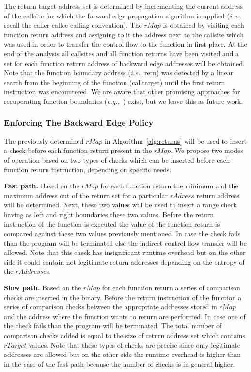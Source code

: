 The return target address set is determined by incrementing the current address of
the callsite for which the forward edge propagation algorithm is applied 
(\textit{i.e.,} recall the caller callee calling convention).
The $rMap$ is obtained by visiting each function return address and assigning to it the address next to the callsite
which was used in order to transfer the control flow to the function in first place. 
At the end of the analysis all callsites and all function returns have been visited and a set for each function return address of backward edge 
addresses will be obtained.
Note that the function boundary address (\textit{i.e.,} retn) was detected by a linear search from the beginning of 
the function (calltarget) until the first return instruction was encountered. We are aware that other promising approaches for recuperating 
function boundaries (\textit{e.g.,}~\cite{function:boundary}) exist, but we leave this as future work.

\subsubsection{Enforcing The Backward Edge Policy}
The previously determined $rMap$ in Algorithm~\ref{alg:returns} will be used to insert a check before each 
function return present in the $rMap$. We propose two modes of operation based on two types
of checks which can be inserted before each function return instruction, depending on specific needs.

\textbf{Fast path.} Based on the $rMap$ for each function return the minimum and the maximum address out of the return set for a particular 
 $rAdress$ return address will be determined. Next, these two values will be used to insert a range check having as left and right boundaries these
 two values. Before the return instruction of the function is executed the value of the function return is compared against these two values previously
 mentioned. In case the check fails than the program will be terminated else the indirect control flow transfer will be allowed.
 Note that this check has insignificant runtime overhead but on the other side it could contain not legitimate return addresses depending 
 on the entropy of the $rAddress$es.
 
\textbf{Slow path.} Based on the $rMap$ for each function return a series of comparison checks are inserted in the binary. 
 Before the return instruction of the function a series of comparison checks between the appropriate 
 addresses stored in $rMap$ and the address where the function wants to return are performed. In case one of the check fails than the 
 program will be terminated. The total number of comparison checks added is equal to the size of return address set which contains $rTarget$ values. 
 Note that these types of checks are precise since only legitimate addresses are allowed but on the other side the runtime overhead is higher than in the 
 case of the fast path because the number of checks is in general higher.


